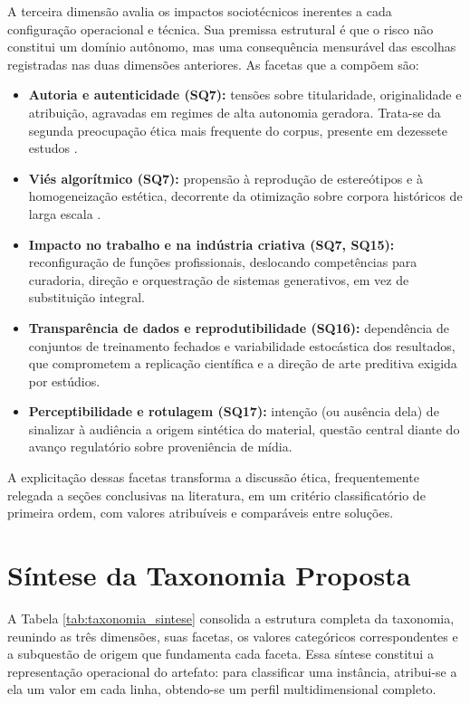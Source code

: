 A terceira dimensão avalia os impactos sociotécnicos inerentes a cada configuração operacional e técnica. Sua premissa estrutural é que o risco não constitui um domínio autônomo, mas uma consequência mensurável das escolhas registradas nas duas dimensões anteriores. As facetas que a compõem são:

\begin{itemize}
    \item \textbf{Autoria e autenticidade (SQ7):} tensões sobre titularidade, originalidade e atribuição, agravadas em regimes de alta autonomia geradora. Trata-se da segunda preocupação ética mais frequente do corpus, presente em dezessete estudos \citep{RothAleo2026}.
    \item \textbf{Viés algorítmico (SQ7):} propensão à reprodução de estereótipos e à homogeneização estética, decorrente da otimização sobre corpora históricos de larga escala \citep{floridi2020gpt3}.
    \item \textbf{Impacto no trabalho e na indústria criativa (SQ7, SQ15):} reconfiguração de funções profissionais, deslocando competências para curadoria, direção e orquestração de sistemas generativos, em vez de substituição integral.
    \item \textbf{Transparência de dados e reprodutibilidade (SQ16):} dependência de conjuntos de treinamento fechados e variabilidade estocástica dos resultados, que comprometem a replicação científica e a direção de arte preditiva exigida por estúdios.
    \item \textbf{Perceptibilidade e rotulagem (SQ17):} intenção (ou ausência dela) de sinalizar à audiência a origem sintética do material, questão central diante do avanço regulatório sobre proveniência de mídia.
\end{itemize}

A explicitação dessas facetas transforma a discussão ética, frequentemente relegada a seções conclusivas na literatura, em um critério classificatório de primeira ordem, com valores atribuíveis e comparáveis entre soluções.

\section{Síntese da Taxonomia Proposta}

A Tabela \ref{tab:taxonomia_sintese} consolida a estrutura completa da taxonomia, reunindo as três dimensões, suas facetas, os valores categóricos correspondentes e a subquestão de origem que fundamenta cada faceta. Essa síntese constitui a representação operacional do artefato: para classificar uma instância, atribui-se a ela um valor em cada linha, obtendo-se um perfil multidimensional completo.

